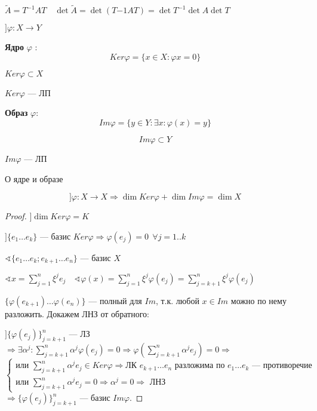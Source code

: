\begin{remark}
    $\tilde A=T^{-1}AT \quad \det\tilde A = \det(T{-1}AT)=\det T^{-1}\det A\det T$
\end{remark}

$] \varphi : X\to Y$

\begin{definition}
    \textbf{Ядро} $\varphi$ :
    $$Ker \varphi=\{x\in X : \varphi x=0\}$$
\end{definition}
\begin{remark}
    $Ker \varphi\subset X$
\end{remark}
\begin{lemma}
    $Ker \varphi$ --- ЛП
\end{lemma}
\begin{definition}
    \textbf{Образ} $\varphi$:
    $$Im \varphi = \{y\in Y : \exists x : \varphi(x)=y\}$$
\end{definition}
\begin{remark}
    $$Im \varphi \subset Y$$
\end{remark}
\begin{lemma}
    $Im \varphi$ --- ЛП
\end{lemma}

\begin{theorem}
    О ядре и образе

    $$] \varphi : X\to X \Rightarrow \dim Ker \varphi + \dim Im \varphi = \dim X$$
\end{theorem}
\begin{proof}
    $] \dim Ker \varphi = K$

    $] \{e_1\ldots e_k\}$ --- базис $Ker \varphi \Rightarrow \varphi(e_j)=0 \ \ \forall j=1..k$

    $\sphericalangle \{e_1\ldots e_k; e_{k+1}\ldots e_n\}$ --- базис $X$

    $\sphericalangle x=\sum\limits_{j=1}^n \xi^j e_j \quad \sphericalangle \varphi(x) = \sum\limits_{j=1}^n \xi^j\varphi(e_j)=\sum\limits_{j=k+1}^n \xi^j \varphi(e_j)$

    $\{\varphi(e_{k+1})\ldots \varphi(e_{n})\}$ --- полный для $Im$, т.к. любой $x\in Im$ можно по нему разложить. Докажем ЛНЗ от обратного:

    $] \{\varphi(e_j)\}_{j=k+1}^n$ --- ЛЗ $\Rightarrow \exists \alpha^j : \sum\limits_{j=k+1}^n \alpha^j\varphi(e_j)=0\Rightarrow\varphi\left(\sum\limits_{j=k+1}^n \alpha^je_j\right)=0\Rightarrow$
    $$\begin{cases}
        \text{или } \sum\limits_{j=k+1}^n \alpha^je_j \in Ker \varphi \Rightarrow \text{ЛК } e_{k+1}\ldots e_n \text{ разложима по } e_1\ldots e_k \text{ --- противоречие} \\
        \text{или } \sum\limits_{j=k+1}^n \alpha^je_j =0 \Rightarrow \alpha^j=0 \Rightarrow \text{ ЛНЗ}
    \end{cases}$$
    $\Rightarrow \{\varphi(e_j)\}_{j=k+1}^n$ --- базис $Im \varphi$.
\end{proof}

